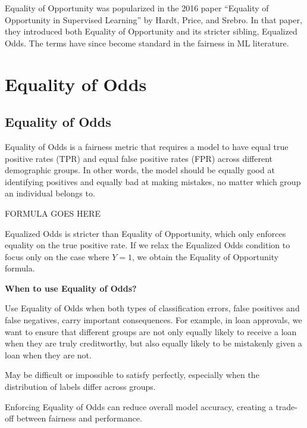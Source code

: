 \clearpage

\thispagestyle{customstyle}

{Equality of Opportunity was popularized in the 2016 paper “Equality of Opportunity in Supervised Learning” by Hardt, Price, and Srebro. 
In that paper, they introduced both Equality of Opportunity and its stricter sibling, Equalized Odds. The terms have since become standard
in the fairness in ML literature.}

\clearpage
\thispagestyle{biasfairnesstyle}
\section{Equality of Odds}
\subsection{Equality of Odds}


Equality of Odds is a fairness metric that requires a model to have equal true positive rates (TPR) and equal false positive rates (FPR)
across different demographic groups. In other words, the model should be equally good at identifying positives and equally bad at making mistakes,
no matter which group an individual belongs to.

\begin{center}
    FORMULA GOES HERE
\end{center}

Equalized Odds is stricter than Equality of Opportunity, which only enforces equality on the true positive rate. If we relax the Equalized Odds
condition to focus only on the case where $Y = 1$, we obtain the Equality of Opportunity formula.

\textbf{When to use Equality of Odds?}

Use Equality of Odds when both types of classification errors, false positives and false negatives, carry important consequences.
For example, in loan approvals, we want to ensure that different groups are not only equally likely to receive a loan when they are
truly creditworthy, but also equally likely to be mistakenly given a loan when they are not.

{
\item May be difficult or impossible to satisfy perfectly, especially when the distribution of labels differ across groups.
\item Enforcing Equality of Odds can reduce overall model accuracy, creating a trade-off between fairness and performance.
}

